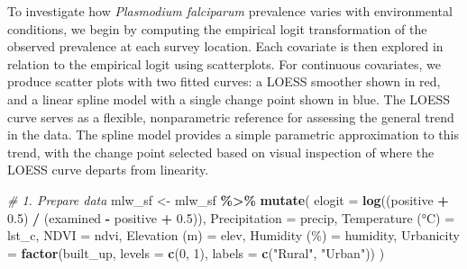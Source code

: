 \documentclass[
  letterpaper,
]{krantz}
\newenvironment{Shaded}{\begin{snugshade}}{\end{snugshade}}
\newcommand{\AttributeTok}[1]{\textcolor[rgb]{0.13,0.29,0.53}{#1}}
\newcommand{\CommentTok}[1]{\textcolor[rgb]{0.56,0.35,0.01}{\textit{#1}}}
\newcommand{\DecValTok}[1]{\textcolor[rgb]{0.00,0.00,0.81}{#1}}
\newcommand{\FloatTok}[1]{\textcolor[rgb]{0.00,0.00,0.81}{#1}}
\newcommand{\FunctionTok}[1]{\textcolor[rgb]{0.13,0.29,0.53}{\textbf{#1}}}
\newcommand{\NormalTok}[1]{#1}
\newcommand{\OtherTok}[1]{\textcolor[rgb]{0.56,0.35,0.01}{#1}}
\newcommand{\SpecialCharTok}[1]{\textcolor[rgb]{0.81,0.36,0.00}{\textbf{#1}}}
\newcommand{\StringTok}[1]{\textcolor[rgb]{0.31,0.60,0.02}{#1}}
\begin{document}
To investigate how \emph{Plasmodium falciparum} prevalence varies with
environmental conditions, we begin by computing the empirical logit
transformation of the observed prevalence at each survey location. Each
covariate is then explored in relation to the empirical logit using
scatterplots. For continuous covariates, we produce scatter plots with
two fitted curves: a LOESS smoother shown in red, and a linear spline
model with a single change point shown in blue. The LOESS curve serves
as a flexible, nonparametric reference for assessing the general trend
in the data. The spline model provides a simple parametric approximation
to this trend, with the change point selected based on visual inspection
of where the LOESS curve departs from linearity.

\begin{Shaded}
\begin{Highlighting}[]

\CommentTok{\# 1. Prepare data}
\NormalTok{mlw\_sf }\OtherTok{\textless{}{-}}\NormalTok{ mlw\_sf }\SpecialCharTok{\%\textgreater{}\%}
  \FunctionTok{mutate}\NormalTok{(}
    \AttributeTok{elogit =} \FunctionTok{log}\NormalTok{((positive }\SpecialCharTok{+} \FloatTok{0.5}\NormalTok{) }\SpecialCharTok{/}\NormalTok{ (examined }\SpecialCharTok{{-}}\NormalTok{ positive }\SpecialCharTok{+} \FloatTok{0.5}\NormalTok{)),}
    \StringTok{\textasciigrave{}}\AttributeTok{Precipitation}\StringTok{\textasciigrave{}} \OtherTok{=}\NormalTok{ precip,}
    \StringTok{\textasciigrave{}}\AttributeTok{Temperature (°C)}\StringTok{\textasciigrave{}} \OtherTok{=}\NormalTok{ lst\_c,}
    \StringTok{\textasciigrave{}}\AttributeTok{NDVI}\StringTok{\textasciigrave{}} \OtherTok{=}\NormalTok{ ndvi,}
    \StringTok{\textasciigrave{}}\AttributeTok{Elevation (m)}\StringTok{\textasciigrave{}} \OtherTok{=}\NormalTok{ elev,}
    \StringTok{\textasciigrave{}}\AttributeTok{Humidity (\%)}\StringTok{\textasciigrave{}} \OtherTok{=}\NormalTok{ humidity,}
    \StringTok{\textasciigrave{}}\AttributeTok{Urbanicity}\StringTok{\textasciigrave{}} \OtherTok{=} \FunctionTok{factor}\NormalTok{(built\_up, }\AttributeTok{levels =} \FunctionTok{c}\NormalTok{(}\DecValTok{0}\NormalTok{, }\DecValTok{1}\NormalTok{), }\AttributeTok{labels =} \FunctionTok{c}\NormalTok{(}\StringTok{"Rural"}\NormalTok{, }\StringTok{"Urban"}\NormalTok{))}
\NormalTok{  )}


\end{Highlighting}
\end{Shaded}
\end{document}
